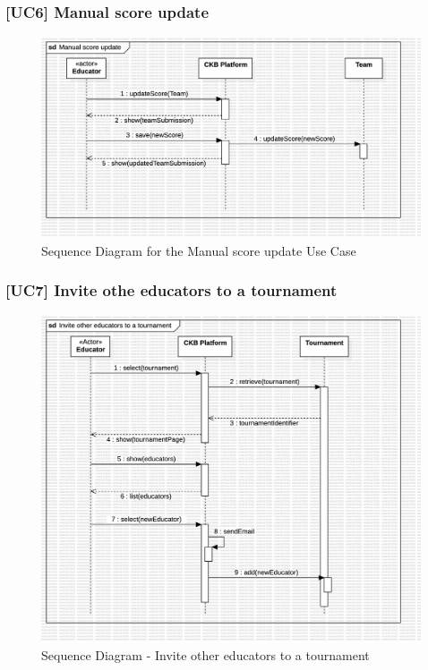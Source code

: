\subsubsection*{[UC6] Manual score update}
\begin{figure}[H]
    \centering
    \includegraphics[width=\textwidth]{Diagrams/UC6SequenceDiagram.jpg}
    \caption{Sequence Diagram for the Manual score update Use Case}
    \label{fig:sequence-diagram-manual-score-update}
\end{figure}

\subsubsection*{[UC7] Invite othe educators to a tournament}
\begin{figure}[H]
    \centering
    \includegraphics[width=\textwidth]{Diagrams/InviteEducators.jpg}
    \caption{Sequence Diagram - Invite other educators to a tournament}
    \label{fig:sequence-diagram-invite-educator}
\end{figure}

